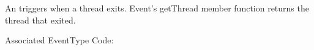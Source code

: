 
An  triggers when a thread exits. Event's getThread
member function returns the thread that exited.

Associated EventType Code: 
